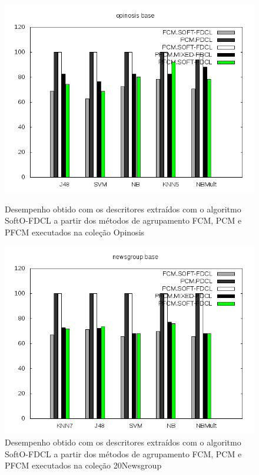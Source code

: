 \begin{figure}[!htp] \centering 
   \begin{minipage}{0.45\textwidth} 
     \centering
    \includegraphics[width=1.0\columnwidth]{assets/pdcl/opinosis} 
    \caption{Desempenho obtido com os descritores extraídos com o algoritmo SoftO-FDCL a partir dos
      métodos de agrupamento FCM,
    PCM e PFCM executados na coleção Opinosis} 
  \label{fig:pfcmopinosis}
  \end{minipage}\hfill 
  \begin{minipage}{0.45\textwidth} \centering
    \includegraphics[width=1.0\columnwidth]{assets/pdcl/newsgroup} 
    \caption{Desempenho obtido com os descritores extraídos com o algoritmo SoftO-FDCL a partir dos
      métodos de agrupamento FCM,
    PCM e PFCM executados na coleção 20Newsgroup} 
     \label{fig:pfcm20news} 
   \end{minipage} 
\end{figure}

